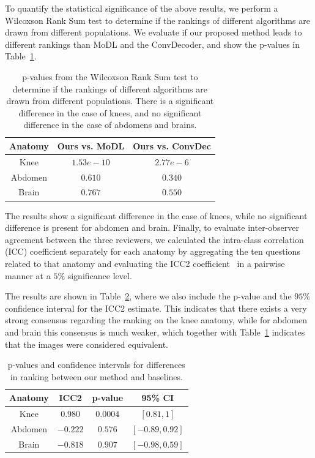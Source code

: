 \documentclass{article}
\begin{document}
To quantify the statistical significance of the above results, we perform a Wilcoxson Rank Sum test to determine if the rankings of different algorithms are drawn from different populations. We evaluate if our proposed method leads to different rankings than MoDL and the ConvDecoder, and show the p-values in Table~\ref{tab:radiologist-pval}.
\begin{table}
    \centering
    \begin{tabular}{|c|c|c|}
    \hline
    Anatomy & Ours vs. MoDL	& Ours vs. ConvDec \\
    \hline
    Knee	& $1.53e-10$ & $2.77e-6$ \\
    Abdomen	& $0.610$	& $0.340$ \\
    Brain	& $0.767$	& $0.550$ \\
    \hline
    \end{tabular}
    \caption{p-values from the Wilcoxson Rank Sum test to determine if the rankings of different algorithms are drawn from different populations. There is a significant difference in the case of knees, and no significant difference in the case of abdomens and brains.}
    \label{tab:radiologist-pval}
\end{table}

The results show a significant difference in the case of knees, while no significant difference is present for abdomen and brain. Finally, to evaluate inter-observer agreement between the three reviewers, we calculated the intra-class correlation (ICC) coefficient separately for each anatomy by aggregating the ten questions related to that anatomy and evaluating the ICC2 coefficient~\cite{pingouin-stats} in a pairwise manner at a $5\%$ significance level.

The results are shown in Table~\ref{tab:radiologist-icc2}, where we also include the p-value and the $95\%$ confidence interval for the ICC2 estimate. This indicates that there exists a very strong consensus regarding the ranking on the knee anatomy, while for abdomen and brain this consensus is much weaker, which together with Table~\ref{tab:radiologist-pval} indicates that the images were considered equivalent.
\begin{table}
    \centering
    \begin{tabular}{|c|c|c|c|}
    \hline
    Anatomy & ICC2	& p-value & 95\% CI \\
    \hline
    Knee	& $0.980$  & $0.0004$ & $[0.81, 1]$ \\
    Abdomen	& $-0.222$ & $0.576$  & $[-0.89, 0.92]$ \\
    Brain	& $-0.818$ & $0.907$  & $[-0.98, 0.59]$ \\
    \hline
    \end{tabular}
    \caption{p-values and confidence intervals for differences in ranking between our method and baselines.}
    \label{tab:radiologist-icc2}
\end{table}
\end{document}
